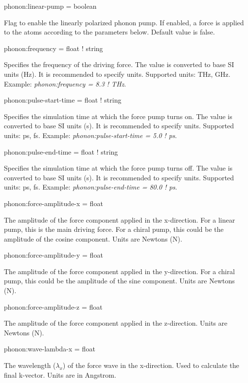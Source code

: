 {\zicf phonon:linear-pump = boolean}
Flag to enable the linearly polarized phonon pump. If enabled, a force is applied to the atoms according to the parameters below. Default value is false.

{\zicf phonon:frequency = float ! string}
Specifies the frequency of the driving force. The value is converted to base SI units (Hz). It is recommended to specify units. Supported units: THz, GHz. Example: \textit{phonon:frequency = 8.3 ! THz}.

{\zicf phonon:pulse-start-time = float ! string}
Specifies the simulation time at which the force pump turns on. The value is converted to base SI units (s). It is recommended to specify units. Supported units: ps, fs. Example: \textit{phonon:pulse-start-time = 5.0 ! ps}.

{\zicf phonon:pulse-end-time = float ! string}
Specifies the simulation time at which the force pump turns off. The value is converted to base SI units (s). It is recommended to specify units. Supported units: ps, fs. Example: \textit{phonon:pulse-end-time = 80.0 ! ps}.

{\zicf phonon:force-amplitude-x = float}
The amplitude of the force component applied in the x-direction. For a linear pump, this is the main driving force. For a chiral pump, this could be the amplitude of the cosine component. Units are Newtons (N).

{\zicf phonon:force-amplitude-y = float}
The amplitude of the force component applied in the y-direction. For a chiral pump, this could be the amplitude of the sine component. Units are Newtons (N).

{\zicf phonon:force-amplitude-z = float}
The amplitude of the force component applied in the z-direction. Units are Newtons (N).

{\zicf phonon:wave-lambda-x = float}
The wavelength ($\lambda_x$) of the force wave in the x-direction. Used to calculate the final k-vector. Units are in Angstrom.

